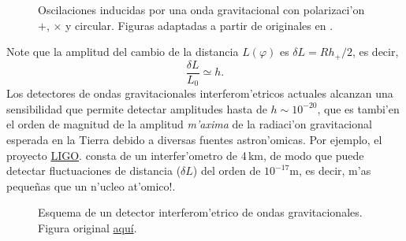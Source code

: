\begin{center}
\begin{figure}[H]
\centerline{}
\centerline{}
\centerline{}
\caption{Oscilaciones inducidas por una onda gravitacional con polarizaci'on $+$, $\times$ y circular. Figuras adaptadas a partir de originales en \cite{Carroll97}.}
\label{fig:og}
\end{figure}
\end{center}
Note que la amplitud del cambio de la distancia $L(\varphi)$ es $\delta L=Rh_+/2$, es decir,
\begin{equation}
\boxed{ \frac{\delta L}{L_0}\simeq h .}
\end{equation}
Los detectores de ondas gravitacionales interferom'etricos actuales alcanzan una sensibilidad que permite detectar amplitudes hasta de $h\sim 10^{-20}$, que es tambi'en el orden de magnitud de la amplitud \textit{m'axima} de la radiaci'on gravitacional esperada en la Tierra debido a diversas fuentes astron'omicas. Por ejemplo, el proyecto \href{http://www.ligo.caltech.edu/}{LIGO}. consta de un interfer'ometro de 4\,km, de modo que puede detectar fluctuaciones de distancia ($\delta L$) del orden de $10^{-17}\text{m}$, es decir, m'as peque\~nas que un n'ucleo at'omico!.

\begin{center}
\begin{figure}[H]
\centerline{}
\caption{Esquema de un detector interferom'etrico de ondas gravitacionales. Figura original \href{http://commons.wikimedia.org/wiki/File:Ligo.svg}{aqu\'i}.}
\label{fig:LIGO}
\end{figure}
\end{center}
